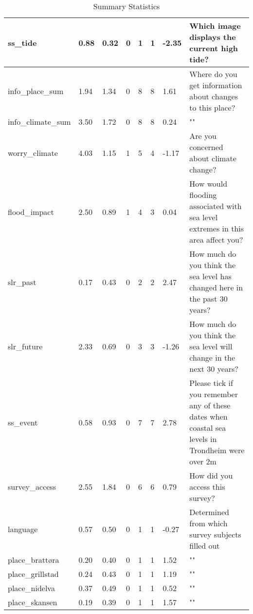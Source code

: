 \begin{center}
\begin{table}[!ht]
\begin{tabular}{|l|l|l|l|l|l|l|l|}
        ss\_tide & 0.88 & 0.32 & 0 & 1 & 1 & -2.35 & Which image displays the current high tide? \\ \hline
        info\_place\_sum & 1.94 & 1.34 & 0 & 8 & 8 & 1.61 & Where do you get information about changes to this place? \\ \hline
        info\_climate\_sum & 3.50 & 1.72 & 0 & 8 & 8 & 0.24 & "" \\ \hline
        worry\_climate & 4.03 & 1.15 & 1 & 5 & 4 & -1.17 & Are you concerned about climate change? \\ \hline
        flood\_impact & 2.50 & 0.89 & 1 & 4 & 3 & 0.04 & How would flooding associated with sea level extremes in this area affect you? \\ \hline
        slr\_past & 0.17 & 0.43 & 0 & 2 & 2 & 2.47 & How much do you think the sea level has changed here in the past 30 years? \\ \hline
        slr\_future & 2.33 & 0.69 & 0 & 3 & 3 & -1.26 & How much do you think the sea level will change in the next 30 years? \\ \hline
        ss\_event & 0.58 & 0.93 & 0 & 7 & 7 & 2.78 & Please tick if you remember any of these dates when coastal sea levels in Trondheim were over 2m \\ \hline
        survey\_access & 2.55 & 1.84 & 0 & 6 & 6 & 0.79 & How did you access this survey? \\ \hline
        language & 0.57 & 0.50 & 0 & 1 & 1 & -0.27 & Determined from which survey subjects filled out \\ \hline
        place\_brattøra & 0.20 & 0.40 & 0 & 1 & 1 & 1.52 & "" \\ \hline
        place\_grillstad & 0.24 & 0.43 & 0 & 1 & 1 & 1.19 & "" \\ \hline
        place\_nidelva & 0.37 & 0.49 & 0 & 1 & 1 & 0.52 & "" \\ \hline
        place\_skansen & 0.19 & 0.39 & 0 & 1 & 1 & 1.57 & "" \\ \hline
    \end{tabular}
    \caption{Summary Statistics}
\label{table:summary_stats}
\end{table}
\end{center}

